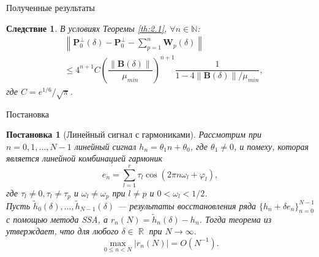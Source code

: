 \documentclass[notheorems, handout]{beamer}
\newtheorem{corollary}{Следствие}
\newtheorem{statement}{Постановка}
\DeclareMathOperator{\R}{\mathbb{R}}
\newcommand{\norm}[1]{\left\|#1\right\|}
\begin{document}
	\begin{frame}{Полученные результаты}
		\begin{corollary}
			В условиях Теоремы \ref{th:2.1}, $\forall n\in\mathbb{N}$:
			\begin{align*}
				&\norm{\mathbf{P}_0^\bot(\delta) - \mathbf{P}_0^\bot - \sum\limits^n_{p=1}\mathbf{W}_p(\delta)}\nonumber
				\\
				&\leqslant 4^{n+1}C\left(\dfrac{\norm{\mathbf{B}(\delta)}}{\mu_{min}}\right)^{n+1}\dfrac{1}{1-4\norm{\mathbf{B}(\delta)}/\mu_{min}},
			\end{align*}
			где $C = e^{1/6}/\sqrt{\pi}$.
		\end{corollary}
	\end{frame}
	\begin{frame}{Постановка}
		\begin{statement}[Линейный сигнал с гармониками]
			Рассмотрим при $n=0,1,\dots,N-1$ линейный сигнал $h_n = \theta_1n+\theta_0$, где $\theta_1 \neq 0$, и помеху, которая является линейной комбинацией гармоник
			\begin{equation*}
				e_n = \sum^r_{l=1}\tau_l\cos(2\pi n\omega_l + \varphi_l),
			\end{equation*} 
			где $\tau_l\neq0,\tau_l\neq\tau_p$ и $\omega_l \neq \omega_p$ при $l\neq p$ и $0 < \omega_l < 1/2$.
			\\
			Пусть $\widetilde{h}_0(\delta),\dots,\widetilde{h}_{N-1}(\delta)$ --- результаты восстановления ряда $\{h_n+\delta e_n\}_{n=0}^{N-1}$ с помощью метода SSA, а $r_n(N) = \widetilde{h}_n(\delta) - h_n$. Тогда теорема из \cite{ZNekrutkin} утверждает, что для любого $\delta\in\R$ при $N\rightarrow\infty$. 
			\begin{equation*}
				\max_{0\leqslant n<N}|r_n(N)|=O(N^{-1}).
			\end{equation*}
		\end{statement}
	\end{frame}
\end{document}
